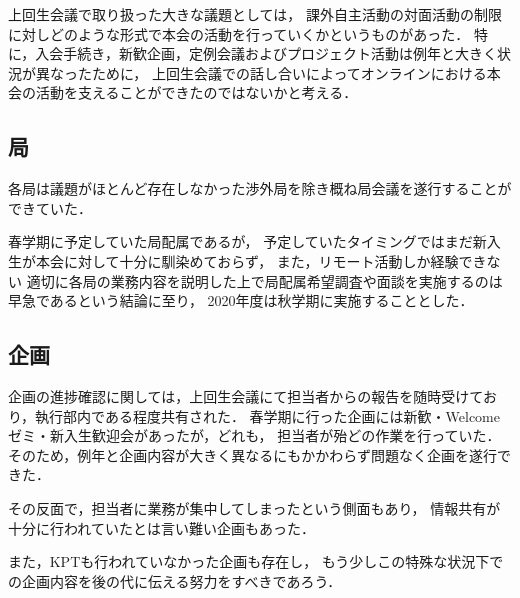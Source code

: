 上回生会議で取り扱った大きな議題としては，
課外自主活動の対面活動の制限に対しどのような形式で本会の活動を行っていくかというものがあった．
特に，入会手続き，新歓企画，定例会議およびプロジェクト活動は例年と大きく状況が異なったために，
上回生会議での話し合いによってオンラインにおける本会の活動を支えることができたのではないかと考える．

\subsection*{局}
各局は議題がほとんど存在しなかった渉外局を除き概ね局会議を遂行することができていた．

春学期に予定していた局配属であるが，
予定していたタイミングではまだ新入生が本会に対して十分に馴染めておらず，
また，リモート活動しか経験できない
適切に各局の業務内容を説明した上で局配属希望調査や面談を実施するのは早急であるという結論に至り，
2020年度は秋学期に実施することとした．


\subsection*{企画}
企画の進捗確認に関しては，上回生会議にて担当者からの報告を随時受けており，執行部内である程度共有された．
春学期に行った企画には新歓・Welcomeゼミ・新入生歓迎会があったが，どれも，
担当者が殆どの作業を行っていた．
そのため，例年と企画内容が大きく異なるにもかかわらず問題なく企画を遂行できた．

その反面で，担当者に業務が集中してしまったという側面もあり，
情報共有が十分に行われていたとは言い難い企画もあった．

また，KPTも行われていなかった企画も存在し，
もう少しこの特殊な状況下での企画内容を後の代に伝える努力をすべきであろう．


